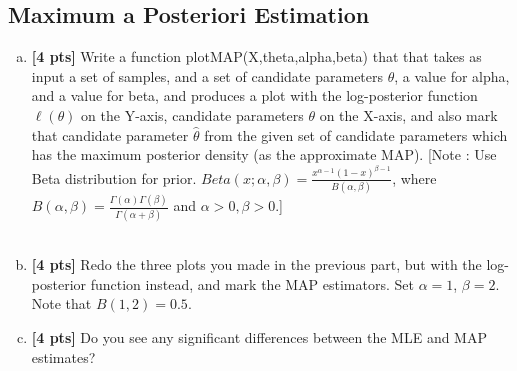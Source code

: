 \documentclass{article}
\newenvironment{soln}{
	\leavevmode\color{blue}\ignorespaces
}{}
\begin{document}
\subsection{Maximum a Posteriori Estimation}
\begin{enumerate}[(a)]
    \item \textbf{[4 pts]} Write a function plotMAP(X,theta,alpha,beta) that that takes as input a set of samples, and a set of candidate parameters $\theta$, a value for alpha, and a value for beta, and produces a plot with the log-posterior function $\ell(\theta)$ on the Y-axis, candidate parameters $\theta$ on the X-axis, and also mark that candidate parameter $\hat{\theta}$ from the given set of candidate parameters which has the maximum posterior density (as the approximate MAP). [Note : Use Beta distribution for prior.
    $
    	Beta(x;\alpha, \beta) = \frac{x^{\alpha - 1} (1-x)^{\beta - 1}}{B(\alpha, \beta)}
    $, where $B(\alpha, \beta) = \frac{\Gamma(\alpha)\Gamma(\beta)}{\Gamma(\alpha+\beta)}$ and $\alpha > 0, \beta > 0$.]\\\\
    \begin{soln}
    
    \end{soln}
	
    \item \textbf{[4 pts]} Redo the three plots you made in the previous part, but with the log-posterior function instead, and mark the MAP estimators.  Set $\alpha = 1$, $\beta = 2$. Note that $B(1,2) = 0.5$.  \\
    \begin{soln}
    
    \end{soln}
	
    \item \textbf{[4 pts]} Do you see any significant differences between the MLE and MAP estimates?
    
    \begin{soln}
    
    \end{soln}
	
\end{enumerate}
\end{document}
